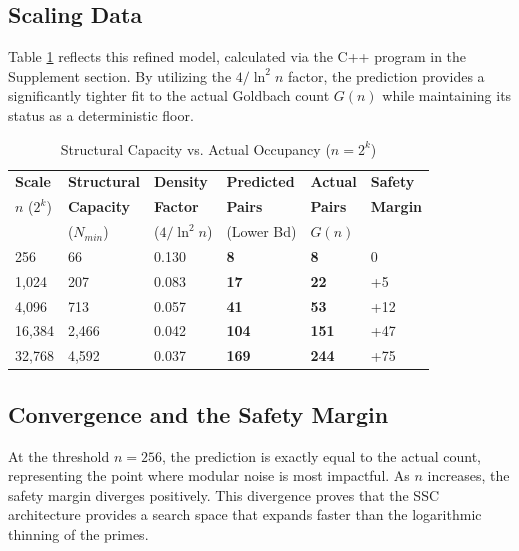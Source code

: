 \documentclass[twoside,9pt]{extarticle}
\begin{document}
\subsection{Scaling Data}

Table \ref{table:scaling_data} reflects this refined model, calculated via the C++ program in the Supplement section. By utilizing the $4/\ln^2 n$ factor, the prediction provides a significantly tighter fit to the actual Goldbach count $G(n)$ while maintaining its status as a deterministic floor.

\begin{table}[!ht]
\centering
\caption{Structural Capacity vs. Actual Occupancy ($n=2^k$)}
\label{table:scaling_data}
\begin{tabular}{@{}llllll@{}}
\toprule
\textbf{Scale} & \textbf{Structural} & \textbf{Density} & \textbf{Predicted} & \textbf{Actual} & \textbf{Safety} \\ 
$n$ ($2^k$) & \textbf{Capacity} & \textbf{Factor} & \textbf{Pairs} & \textbf{Pairs} & \textbf{Margin} \\
& ($N_{min}$) & ($4/\ln^2 n$) & (Lower Bd) & $G(n)$ & \\ \midrule
256 & 66 & 0.130 & \textbf{8} & \textbf{8} & 0 \\
1,024 & 207 & 0.083 & \textbf{17} & \textbf{22} & +5 \\
4,096 & 713 & 0.057 & \textbf{41} & \textbf{53} & +12 \\
16,384 & 2,466 & 0.042 & \textbf{104} & \textbf{151} & +47 \\
32,768 & 4,592 & 0.037 & \textbf{169} & \textbf{244} & +75 \\ \bottomrule
\end{tabular}
\end{table}

\subsection{Convergence and the Safety Margin}
\label{subsec:convergence}

At the threshold $n=256$, the prediction is exactly equal to the actual count, representing the point where modular noise is most impactful. As $n$ increases, the safety margin diverges positively. This divergence proves that the SSC architecture provides a search space that expands faster than the logarithmic thinning of the primes.
\end{document}
